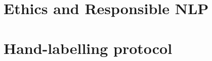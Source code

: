 \documentclass[11pt]{article}
\begin{document}
\section*{Ethics and Responsible NLP}




\appendix
\section{Hand-labelling protocol}
\label{sec:appendix}
\end{document}
